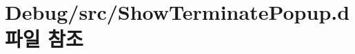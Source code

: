 \hypertarget{_show_terminate_popup_8d}{\section{Debug/src/\+Show\+Terminate\+Popup.d 파일 참조}
\label{_show_terminate_popup_8d}
}

